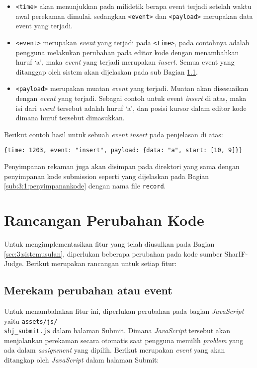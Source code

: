 \begin{itemize}
    \item \verb|<time>| akan menunjukkan pada milidetik berapa event terjadi setelah waktu awal perekaman dimulai. sedangkan \verb|<event>| dan \verb|<payload>| merupakan data event yang terjadi.

    \item \verb|<event>| merupakan \textit{event} yang terjadi pada \verb|<time>|, pada contohnya adalah pengguna melakukan perubahan pada editor kode dengan menambahkan huruf `a', maka \textit{event} yang terjadi merupakan \textit{insert}. Semua event yang ditanggap oleh sistem akan dijelaskan pada sub Bagian \ref{sub:4:3:merekam}.

    \item \verb|<payload>| merupakan muatan \textit{event} yang terjadi. Muatan akan disesuaikan dengan \textit{event} yang terjadi. Sebagai contoh untuk event \textit{insert} di atas, maka isi dari \textit{event} tersebut adalah huruf `a', dan posisi kursor dalam editor kode dimana huruf tersebut dimasukkan.
\end{itemize}

Berikut contoh hasil untuk sebuah \textit{event insert} pada penjelasan di atas:

\begin{center}
    \verb|{time: 1203, event: "insert", payload: {data: "a", start: [10, 9]}}|
\end{center}

Penyimpanan rekaman juga akan disimpan pada direktori yang sama dengan penyimpanan kode submission seperti yang dijelaskan pada Bagian \ref{sub:3:1:penyimpanankode} dengan nama file \verb|record|.

\section{Rancangan Perubahan Kode}

Untuk mengimplementasikan fitur yang telah diusulkan pada Bagian \ref{sec:3:sistemusulan}, diperlukan beberapa perubahan pada kode sumber SharIF-Judge. Berikut merupakan rancangan untuk setiap fitur:

\subsection{Merekam perubahan atau event}
\label{sub:4:3:merekam}

Untuk menambahakan fitur ini, diperlukan perubahan pada bagian \textit{JavaScript} yaitu \verb|assets/js/|\\\verb|shj_submit.js| dalam halaman Submit. Dimana \textit{JavaScript} tersebut akan menjalankan perekaman secara otomatis saat pengguna memilih \textit{problem} yang ada dalam \textit{assignment} yang dipilih. Berikut merupakan \textit{event} yang akan ditangkap oleh \textit{JavaScript} dalam halaman Submit:


